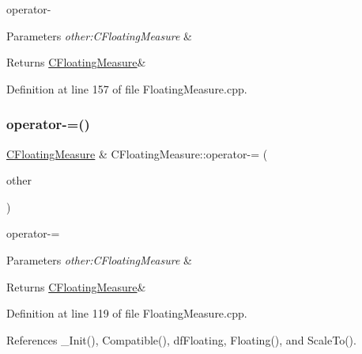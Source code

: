 operator-\/ 


\begin{DoxyParams}{Parameters}
{\em other\+:\+C\+Floating\+Measure} & \\
\hline
\end{DoxyParams}
\begin{DoxyReturn}{Returns}
\hyperlink{classCFloatingMeasure}{C\+Floating\+Measure}\& 
\end{DoxyReturn}


Definition at line 157 of file Floating\+Measure.\+cpp.

\mbox{\label{classCFloatingMeasure_a3661f71ed47a6659f7e27adff3c5c369}} 
\subsubsection{\texorpdfstring{operator-\/=()}{operator-=()}}
{\footnotesize\ttfamily \hyperlink{classCFloatingMeasure}{C\+Floating\+Measure} \& C\+Floating\+Measure\+::operator-\/= (\begin{DoxyParamCaption}\item[{const \hyperlink{classCFloatingMeasure}{C\+Floating\+Measure} \&}]{other }\end{DoxyParamCaption})}



operator-\/= 


\begin{DoxyParams}{Parameters}
{\em other\+:\+C\+Floating\+Measure} & \\
\hline
\end{DoxyParams}
\begin{DoxyReturn}{Returns}
\hyperlink{classCFloatingMeasure}{C\+Floating\+Measure}\& 
\end{DoxyReturn}


Definition at line 119 of file Floating\+Measure.\+cpp.



References \+\_\+\+Init(), Compatible(), df\+Floating, Floating(), and Scale\+To().

\mbox{\label{classCFloatingMeasure_acb68f4d17606dc2312f4efabe877ab80}} 

